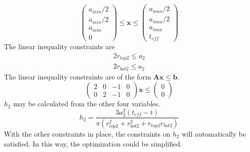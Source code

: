 \documentclass[12pt]{article}
\numberwithin{equation}{section}
\numberwithin{equation}{section}
\begin{document}
\begin{equation}
\left(
\begin{matrix}
a_{min}/2\\ 
a_{min}/2\\
a_{min}\\ 
0 
\end{matrix} \right )
\leq \mathbf{x}
 \leq 
 \left(
\begin{matrix}
a_{max}/2 \\ a_{max}/2 \\ a_{max}  \\ t_{eff}
\end{matrix} \right )
\end{equation}
The linear inequality constraints are 
\begin{align*}   
2r_{top2} \leq a_2 \\
2r_{bot2} \leq a_2 
\end{align*}
The linear inequality constraints are of the form $\mathbf{A} \mathbf{x} \leq \mathbf{b}$.
\begin{equation}
\left(
\begin{matrix}
2 & 0 & -1  &  0 \\
0 & 2 & -1 & 0 
\end{matrix}
\right ) \mathbf{x}  \leq \left ( \begin{matrix} 0\\ 0 \end{matrix} \right ) 
\end{equation}
$h_2$ may be calculated from the other four variables.  
\begin{equation}
 h_2 = \frac{3 a_2^2 (t_{eff} - t)}{\pi (r_{top2}^2+r_{bot2}^2+r_{top2}r_{bot2})}
\end{equation}
With the other constraints in place, the constraints on $h_2$ will automatically be satisfied. In this way, the optimization could be simplified.  \\
\end{document}
